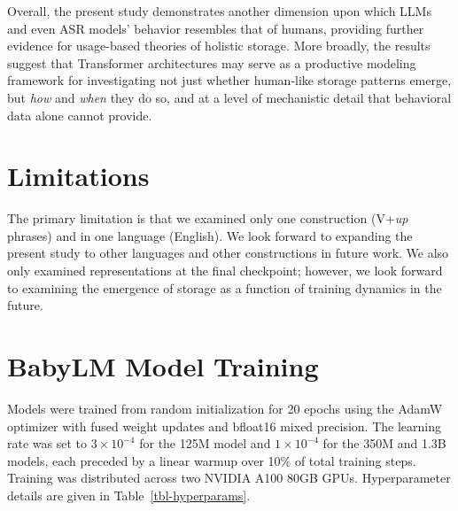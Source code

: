 \documentclass[11pt]{article}
\begin{document}
Overall, the present study demonstrates another dimension upon which
LLMs and even ASR models' behavior resembles that of humans, providing
further evidence for usage-based theories of holistic storage. More
broadly, the results suggest that Transformer architectures may serve as
a productive modeling framework for investigating not just whether
human-like storage patterns emerge, but \emph{how} and \emph{when} they
do so, and at a level of mechanistic detail that behavioral data alone
cannot provide.

\section{Limitations}\label{limitations}

The primary limitation is that we examined only one construction
(V+\emph{up} phrases) and in one language (English). We look forward to
expanding the present study to other languages and other constructions
in future work. We also only examined representations at the final
checkpoint; however, we look forward to examining the emergence of
storage as a function of training dynamics in the future.

\clearpage

\clearpage

\onecolumn

\appendix

\section{BabyLM Model Training}\label{babylm-model-training}

Models were trained from random initialization for 20 epochs using the
AdamW optimizer with fused weight updates and bfloat16 mixed precision.
The learning rate was set to \(3 \times 10^{-4}\) for the 125M model and
\(1 \times 10^{-4}\) for the 350M and 1.3B models, each preceded by a
linear warmup over 10\% of total training steps. Training was
distributed across two NVIDIA A100 80GB GPUs. Hyperparameter details are
given in Table~\ref{tbl-hyperparams}.
\end{document}
